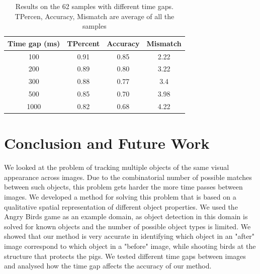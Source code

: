 \documentclass[letterpaper]{article}
\begin{document}
\begin{table}[h!]
\caption{Results on the 62 samples with different time gaps. TPercen, Accuracy, Mismatch are average of all the samples }\label{empiResults_2}
\centering
\begin{tabular}{c|c|c|c}
\hline
Time gap (ms) & TPercent & Accuracy & Mismatch\\
\hline
100 & 0.91 & 0.85 & 2.22\\
200 & 0.89 & 0.80 & 3.22\\
300 & 0.88 & 0.77 & 3.4\\
500 & 0.85 & 0.70 & 3.98\\
1000 & 0.82 & 0.68 & 4.22\\
\hline
\end{tabular}
\end{table}

\section{Conclusion and Future Work}

We looked at the problem of tracking multiple objects of the same visual appearance across images. Due to the combinatorial number of possible matches between such objects, this problem gets harder the more time passes between images. We developed a method for solving this problem that is based on a qualitative spatial representation of different object properties. We used the Angry Birds game as an example domain, as object detection in this domain is solved for known objects and the number of possible object types is limited. We showed that our method is very accurate in identifying which object in an "after" image correspond to which object in a "before" image, while shooting birds at the structure that protects the pigs. We tested different time gaps between images and analysed how the time gap affects the accuracy of our method. 
\end{document}
